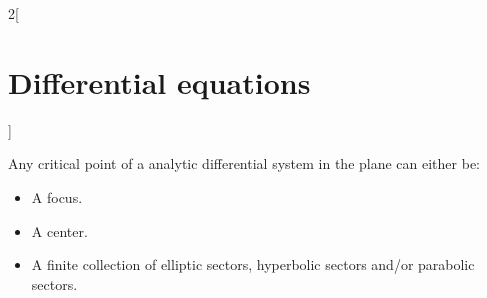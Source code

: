 \documentclass[../../../main.tex]{subfiles}
\begin{document}
\begin{multicols}{2}[\section{Differential equations}]
\begin{definition}
\begin{center}
\begin{minipage}[b]{0.475\linewidth}
        \label{DE_apsector}
      \end{minipage}\hfill
      \begin{minipage}[b]{0.475\linewidth}
        \centering
        
        \label{DE_rpsector}
      \end{minipage}
    \end{center}
  \end{definition}
  \begin{proposition}
    Any critical point of a analytic differential system in the plane can either be:
    \begin{itemize}
      \item A focus.
      \item A center.
      \item A finite collection of elliptic sectors, hyperbolic sectors and/or parabolic sectors.
    \end{itemize}
  \end{proposition}

\end{multicols}
\end{document}
